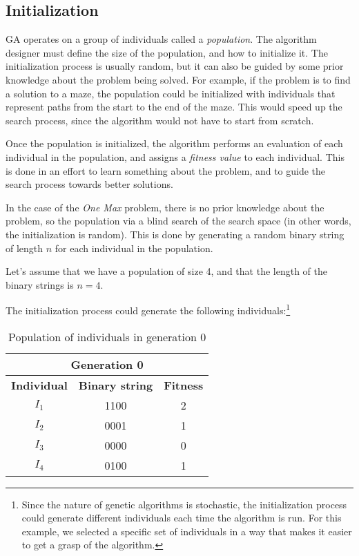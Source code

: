\subsection{Initialization}
\label{sec:genetic_algorithms:initialization}
  GA operates on a group of individuals called a \emph{population}.
  The algorithm designer must define the size of the population, and how to initialize it.
  The initialization process is usually random, but it can also be guided by some prior knowledge
  about the problem being solved.
  For example, if the problem is to find a solution to a maze, the population could be initialized
  with individuals that represent paths from the start to the end of the maze.
  This would speed up the search process, since the algorithm would not have to start from scratch.

  Once the population is initialized, the algorithm performs an evaluation of each individual in
  the population, and assigns a \emph{fitness value} to each individual.
  This is done in an effort to learn something about the problem, and to guide the search process
  towards better solutions.

  In the case of the \emph{One Max} problem, there is no prior knowledge about the problem, so the
  population via a blind search of the search space (in other words, the initialization is random).
  This is done by generating a random binary string of length \(n\) for each individual in the
  population.

  Let's assume that we have a population of size 4, and that the length of the binary strings is
  \(n = 4\). 

  The initialization process could generate the following individuals:\footnote{
    Since the nature of genetic algorithms is stochastic, the initialization process could generate
    different individuals each time the algorithm is run.
    For this example, we selected a specific set of individuals in a way that makes it easier to
    get a grasp of the algorithm.
  }

  \begin{table}[H]
    \label{tab:genetic_algorithms:initialization:population}
    \centering
    \begin{tabular}{c|c|c}
      \multicolumn{3}{c}{\textbf{Generation 0}} \\
      \hline
      \hline
      \textbf{Individual} & \textbf{Binary string} & \textbf{Fitness} \\
      \hline
      \(I_1\) & 1100 & 2 \\
      \(I_2\) & 0001 & 1 \\
      \(I_3\) & 0000 & 0 \\
      \(I_4\) & 0100 & 1 \\
    \end{tabular}
    \caption{Population of individuals in generation 0}
  \end{table}

